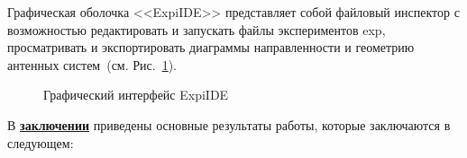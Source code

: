 Графическая оболочка <<ExpiIDE>> представляет собой файловый инспектор с возможностью редактировать и запускать файлы экспериментов exp, просматривать и экспортировать диаграммы направленности и геометрию антенных систем~(см. Рис.~\ref{ris:expi_ide}).
\begin{figure}[h]
    \centering
    \vspace{0.7em}
    \caption{Графический интерфейс ExpiIDE}
    \label{ris:expi_ide}
\end{figure}

\FloatBarrier
{}                                  %
В \underline{\textbf{заключении}} приведены основные результаты работы, которые заключаются в следующем:



